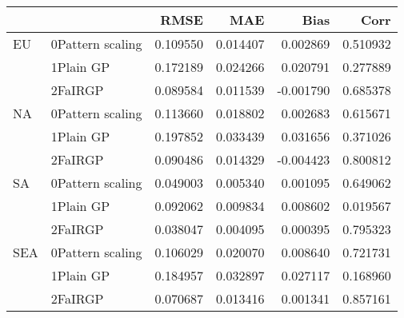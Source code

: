 \begin{tabular}{llrrrr}
\toprule
    &         &      RMSE &       MAE &      Bias &      Corr \\
\midrule
EU & 0Pattern scaling &  0.109550 &  0.014407 &  0.002869 &  0.510932 \\
    & 1Plain GP &  0.172189 &  0.024266 &  0.020791 &  0.277889 \\
    & 2FaIRGP &  0.089584 &  0.011539 & -0.001790 &  0.685378 \\
NA & 0Pattern scaling &  0.113660 &  0.018802 &  0.002683 &  0.615671 \\
    & 1Plain GP &  0.197852 &  0.033439 &  0.031656 &  0.371026 \\
    & 2FaIRGP &  0.090486 &  0.014329 & -0.004423 &  0.800812 \\
SA & 0Pattern scaling &  0.049003 &  0.005340 &  0.001095 &  0.649062 \\
    & 1Plain GP &  0.092062 &  0.009834 &  0.008602 &  0.019567 \\
    & 2FaIRGP &  0.038047 &  0.004095 &  0.000395 &  0.795323 \\
SEA & 0Pattern scaling &  0.106029 &  0.020070 &  0.008640 &  0.721731 \\
    & 1Plain GP &  0.184957 &  0.032897 &  0.027117 &  0.168960 \\
    & 2FaIRGP &  0.070687 &  0.013416 &  0.001341 &  0.857161 \\
\bottomrule
\end{tabular}
